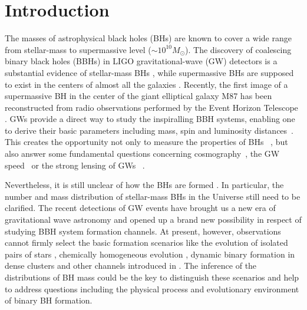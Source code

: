 \documentclass[twocolumn]{aastex62}
\newcommand{\kai}[1]{\textcolor{red}{[{\bf Kai}: #1]}}
\begin{document}

\section{Introduction} \label{sec_intro}

The masses of astrophysical black holes (BHs) are known to cover a wide range from stellar-mass to supermassive level ($\sim10^{10} M_{\odot}$). The discovery of 
coalescing binary black holes (BBHs) in LIGO gravitational-wave (GW) detectors is a substantial evidence of stellar-mass BHs \citep{Abbott2016}, while supermassive BHs are supposed to exist in the centers of almost all the galaxies \citep{Lynden-Bell1969, Kormendy1995}. Recently, the first image of a supermassive BH in the center of the giant elliptical galaxy M87 has been reconstructed from radio observations performed by the Event Horizon Telescope \citep{Alberdi2019}. 
GWs provide a direct way to study the inspiralling BBH systems, enabling one to derive their basic parameters including mass, spin and luminosity distances~\citep{Abbott2017phy, Abbott2018}. This creates the opportunity not only to measure the properties of BHs ~\citep{Abbott2018b}, but also answer some fundamental questions concerning cosmography~\citep{Liao2017, Ding2019, Cai2017}, the GW speed~\citep{Fan2017, Collett2017} or the strong lensing of GWs ~\citep{Ola2013, Biesiada2014, Ding2015}. %

Nevertheless, it is still unclear of how the BHs are formed \citep{Fryer1999, Fryer2001, Mirabel2016}. In particular, the number and mass distribution of stellar-mass BHs in the Universe still need to be clarified.
The recent detections of GW events have brought us a new era of gravitational wave astronomy \citep[e.g.,][]{Abbott2016, Abbott2016_sum, Abbott2018} and opened up a  brand new possibility in respect of studying BBH system formation channels. 
At present, however, observations cannot firmly select the basic formation scenarios like the evolution of isolated pairs of stars \citep{Bethe1998, Portegies1998}, chemically homogeneous evolution \citep{Marchant2016, deMink2016}, dynamic binary formation in dense clusters \citep{Portegies2000, Kulkarni1993} and other channels introduced in \citet{Abbott2018b}.
The inference of the distributions of BH mass could be the key to distinguish these scenarios and help to address questions including the physical process and evolutionary environment of binary BH formation.
\end{document}
